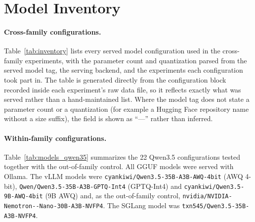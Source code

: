 \documentclass[11pt]{article}
\begin{document}
\section{Model Inventory}
\label{app:models}

\paragraph{Cross-family configurations.}
Table~\ref{tab:inventory} lists every served model configuration used in the
cross-family experiments, with the parameter count and quantization parsed from
the served model tag, the serving backend, and the experiments each
configuration took part in. The table is generated directly from the
configuration block recorded inside each experiment's raw data file, so it
reflects exactly what was served rather than a hand-maintained list. Where the
model tag does not state a parameter count or a quantization (for example a
Hugging Face repository name without a size suffix), the field is shown as
``---'' rather than inferred.



\paragraph{Within-family configurations.}
Table~\ref{tab:models_qwen35} summarizes the 22 Qwen3.5 configurations tested
together with the out-of-family control. All GGUF models were served with
Ollama. The vLLM models were
\texttt{cyankiwi/\allowbreak Qwen3.5-35B-A3B-AWQ-4bit} (AWQ 4-bit),
\texttt{Qwen/\allowbreak Qwen3.5-35B-A3B-GPTQ-Int4} (GPTQ-Int4) and
\texttt{cyankiwi/\allowbreak Qwen3.5-9B-AWQ-4bit} (9B AWQ) and, as the out-of-family
control,
\texttt{nvidia/\allowbreak NVIDIA-\allowbreak Nemotron--Nano-\allowbreak 30B-A3B-\allowbreak NVFP4}.
The SGLang model was \texttt{txn545/\allowbreak Qwen3.5-35B-A3B-NVFP4}.
\end{document}
